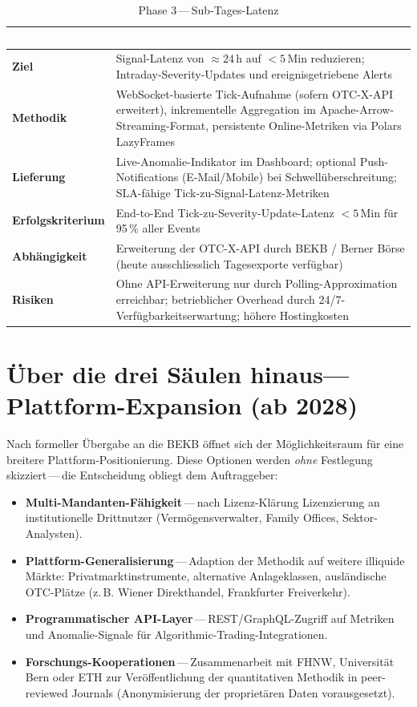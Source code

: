 \documentclass[11pt, a4paper, oneside, openany]{report}
\begin{document}
\begin{table}[H]
\centering
\caption{Phase 3\,---\,Sub-Tages-Latenz}
\label{tab:phase3}
\sffamily\small
\begin{tabularx}{\textwidth}{>{\bfseries\sffamily\color{SwissRed}}p{2.4cm} X}
  \toprule
  \rowcolor{DeepNavy} \textcolor{white}{\textbf{Aspekt}} & \textcolor{white}{\textbf{Inhalt}} \\
  \midrule
  Ziel          & Signal-Latenz von $\approx 24$\,h auf $< 5$\,Min reduzieren; Intraday-Severity-Updates und ereignisgetriebene Alerts \\
  Methodik      & WebSocket-basierte Tick-Aufnahme (sofern OTC-X-API erweitert), inkrementelle Aggregation im Apache-Arrow-Streaming-Format, persistente Online-Metriken via Polars LazyFrames \\
  Lieferung     & Live-Anomalie-Indikator im Dashboard; optional Push-Notifications (E-Mail/Mobile) bei Schwellüberschreitung; SLA-fähige Tick-zu-Signal-Latenz-Metriken \\
  Erfolgs\-kriterium & End-to-End Tick-zu-Severity-Update-Latenz $< 5$\,Min für 95\,\% aller Events \\
  Abhängig\-keit & Erweiterung der OTC-X-API durch BEKB / Berner Börse (heute ausschliesslich Tagesexporte verfügbar) \\
  Risiken       & Ohne API-Erweiterung nur durch Polling-Approximation erreichbar; betrieblicher Overhead durch 24/7-Verfügbarkeitserwartung; höhere Hostingkosten \\
  \bottomrule
\end{tabularx}
\end{table}

\section{Über die drei Säulen hinaus\;---\;Plattform-Expansion (ab 2028)}

Nach formeller Übergabe an die BEKB öffnet sich der Möglichkeitsraum für eine breitere Plattform-Positionierung. Diese Optionen werden \emph{ohne} Festlegung skizziert\,---\,die Entscheidung obliegt dem Auftraggeber:

\begin{itemize}
  \item \textbf{Multi-Mandanten-Fähigkeit}\,---\,nach Lizenz-Klärung Lizenzierung an institutionelle Drittnutzer (Vermögensverwalter, Family Offices, Sektor-Analysten).
  \item \textbf{Plattform-Generalisierung}\,---\,Adaption der Methodik auf weitere illiquide Märkte: Privatmarktinstrumente, alternative Anlageklassen, ausländische OTC-Plätze (z.\,B. Wiener Direkthandel, Frankfurter Freiverkehr).
  \item \textbf{Programmatischer API-Layer}\,---\,REST/GraphQL-Zugriff auf Metriken und Anomalie-Signale für Algorithmic-Trading-Integrationen.
  \item \textbf{Forschungs-Kooperationen}\,---\,Zusammenarbeit mit FHNW, Universität Bern oder ETH zur Veröffentlichung der quantitativen Methodik in peer-reviewed Journals (Anonymisierung der proprietären Daten vorausgesetzt).
\end{itemize}
\end{document}
